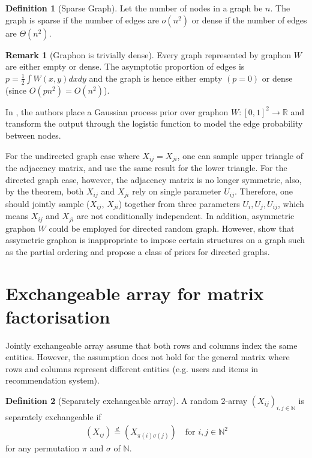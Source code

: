 \documentclass{article}
\theoremstyle{definition}
\newtheorem{definition}{Definition}
\newtheorem{remark}{Remark}
\begin{document}
\begin{definition}[Sparse Graph]
Let the number of nodes in a graph be $n$. The graph is sparse if the number of edges are $o(n^2)$ or dense if the number of edges are $\Theta(n^2)$.
\end{definition}

\begin{remark}[Graphon is trivially dense]
Every graph represented by graphon $W$ are either empty or dense. The asymptotic proportion of edges is $p = \frac{1}{2}\int W(x, y) dxdy$ and the graph is hence either empty $(p=0)$ or dense (since $O(pn^2) = O(n^2)$).
\end{remark}

In \cite{Lloyd2013}, the authors place a Gaussian process prior over graphon $W:[0,1]^2 \rightarrow \mathbb{R}$ and transform the output through the logistic function to model the edge probability between nodes.

For the undirected graph case where $X_{ij} = X_{ji}$, one can sample upper triangle of the adjacency matrix, and use the same result for the lower triangle. For the directed graph case, however, the adjacency matrix is no longer symmetric, also, by the theorem, both $X_{ij}$ and $X_{ji}$ rely on single parameter $U_{ij}$. Therefore, one should jointly sample ($X_{ij}$, $X_{ji}$) together from three parameters $U_{i}, U_{j}, U_{ij}$, which means $X_{ij}$ and $X_{ji}$ are not conditionally independent. In addition, asymmetric graphon $W$ could be employed for directed random graph. However, \cite{Cai2015} show that assymetric graphon is inappropriate to impose certain structures on a graph such as the partial ordering and propose a class of priors for directed graphs.

\section{Exchangeable array for matrix factorisation}
Jointly exchangeable array assume that both rows and columns index the same entities. However, the assumption does not hold for the general matrix where rows and columns represent different entities (e.g. users and items in recommendation system).

\begin{definition}[Separately exchangeable array]A random 2-array $(X_{ij})_{i,j\in \mathbb{N}}$ is separately exchangeable if
\begin{align}
(X_{ij}) \stackrel{d}{=} (X_{\pi(i)\sigma(j)}) \quad \text{for } i,j \in \mathbb{N}^2
\end{align}
for any permutation $\pi$ and $\sigma$ of $\mathbb{N}$.
\end{definition}
\end{document}
